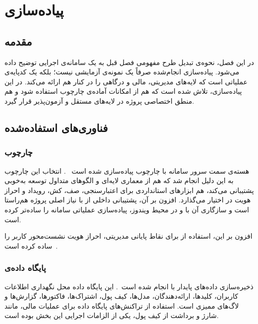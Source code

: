 \chapter{پیاده‌سازی}
\label{ch:implementation}

\section{مقدمه}

در این فصل، نحوه‌ی تبدیل طرح مفهومی فصل قبل به یک سامانه‌ی اجرایی توضیح
داده می‌شود. پیاده‌سازی انجام‌شده صرفاً یک نمونه‌ی آزمایشی نیست؛ بلکه
یک کدپایه‌ی عملیاتی است که لایه‌های مدیریتی، مالی و درگاهی را در کنار
هم ارائه می‌کند. در این پیاده‌سازی، تلاش شده است که هم از امکانات آماده‌ی
چارچوب  استفاده شود و هم منطق اختصاصی پروژه در لایه‌های مستقل
و آزمون‌پذیر قرار گیرد.

\section{فناوری‌های استفاده‌شده}

\subsection{چارچوب }

هسته‌ی سمت سرور سامانه با چارچوب  پیاده‌سازی شده است
~\cite{laravel2024}. انتخاب این چارچوب به این دلیل انجام شد که هم از
معماری لایه‌ای و الگوهای متداول توسعه به‌خوبی پشتیبانی می‌کند، هم ابزارهای
استانداردی برای اعتبارسنجی، صف، کش، رویداد و احراز هویت در اختیار
می‌گذارد. افزون بر آن، پشتیبانی داخلی از  با نیاز اصلی پروژه
هم‌راستا است و سازگاری آن با  و  در محیط
ویندوز، پیاده‌سازی عملیاتی سامانه را ساده‌تر کرده است.

افزون بر این، استفاده از  برای نقاط پایانی مدیریتی،
احراز هویت نشست‌محور کاربر را ساده کرده است~\cite{sanctum2024}.

\subsection{پایگاه داده‌ی }

ذخیره‌سازی داده‌های پایدار با  انجام شده است~\cite{sqlserver2024}.
این پایگاه داده محل نگهداری اطلاعات کاربران، کلیدها، ارائه‌دهندگان،
مدل‌ها، کیف پول، اشتراک‌ها، فاکتورها، گزارش‌ها و لاگ‌های ممیزی است.
استفاده از تراکنش‌های پایگاه داده برای عملیات مالی، مانند شارژ و برداشت
از کیف پول، یکی از الزامات اجرایی این بخش بوده است.

